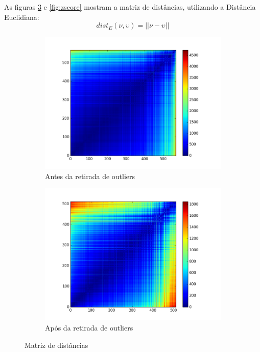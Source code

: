 \documentclass[11pt,a4paper]{article}
\numberwithin{equation}{section}
\begin{document}
As figuras \ref{fig:distorig} e \ref{fig:zscore} mostram a matriz de distâncias, utilizando a Distância Euclidiana:
\[dist_E(\nu,\upsilon) = ||\nu-\upsilon||\]


\begin{figure}[H]
\centering
\begin{subfigure}{.5\textwidth}
  \centering
  \includegraphics[width=\linewidth]{./img/distance_out}
  \caption{Antes da retirada de outliers}
  \label{fig:antes_out}
\end{subfigure}%
\begin{subfigure}{.5\textwidth}
  \centering
  \includegraphics[width=\linewidth]{./img/distance_clean}
  \caption{Após da retirada de outliers}
  \label{fig:apos_out}
\end{subfigure}
\caption{Matriz de distâncias}
\label{fig:distorig}
\end{figure}
\end{document}
